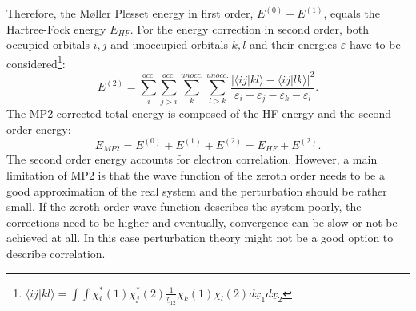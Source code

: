 \documentclass[11pt,DIV=13,BCOR=5mm,a4paper,headinclude]{scrbook}
\renewcommand{\vec}[1]{\underline{#1}}
\begin{document}
Therefore, the M\o{}ller Plesset energy in first order, $E^{(0)}+E^{(1)}$, equals the Hartree-Fock energy $E_{HF}$.
For the energy correction in second order, both occupied orbitals $i,j$ and unoccupied orbitals $k,l$ and their energies $\varepsilon$ have to be considered\footnote{$\langle ij|kl\rangle=\int\int\chi^\ast_i(1)\chi^\ast_j(2)\frac{1}{\vec{r}_{12}}\chi_k(1)\chi_l(2) d\vec{x}_1d\vec{x}_2$}:
\begin{equation}
 E^{(2)}=\sum\limits_{i}^{occ.}\sum\limits_{j>i}^{occ.}\sum\limits_{k}^{unocc.}\sum\limits_{l>k}^{unocc.} \frac{|\langle ij|kl\rangle - \langle ij|lk\rangle|^2}{\varepsilon_i + \varepsilon_j - \varepsilon_k - \varepsilon_l}.
\end{equation}
The MP2-corrected total energy is composed of the HF energy and the second order energy:
\begin{equation}
 E_{MP2} = E^{(0)}+E^{(1)} + E^{(2)} = E_{HF} + E^{(2)}.
\end{equation}
The second order energy accounts for electron correlation.
However, a main limitation of MP2 is that the wave function of the zeroth order needs to be a good approximation of the real system and the perturbation should be rather small.
If the zeroth order wave function describes the system poorly, the corrections need to be higher and eventually, convergence can be slow or not be achieved at all.
In this case perturbation theory might not be a good option to describe correlation.

\end{document}
